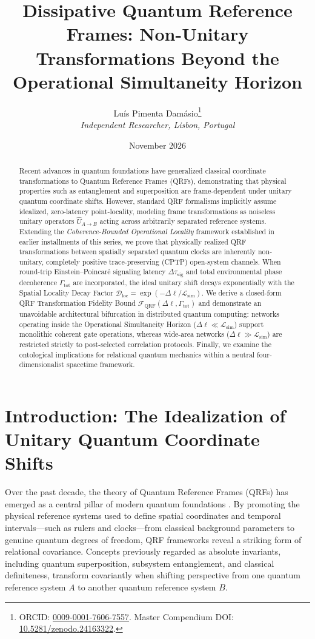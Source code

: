 \documentclass[11pt,a4paper]{article}
\title{\textbf{Dissipative Quantum Reference Frames: Non-Unitary Transformations Beyond the Operational Simultaneity Horizon}}
\author{
    Luís {Pimenta Damásio}\thanks{ORCID: \href{https://orcid.org/0009-0001-7606-7557}{0009-0001-7606-7557}. Master Compendium DOI: \href{https://doi.org/10.5281/zenodo.24163322}{10.5281/zenodo.24163322}.}\\
    \textit{Independent Researcher, Lisbon, Portugal}
}
\date{November 2026}
\begin{document}
\maketitle

\begin{abstract}
Recent advances in quantum foundations have generalized classical coordinate transformations to Quantum Reference Frames (QRFs), demonstrating that physical properties such as entanglement and superposition are frame-dependent under unitary quantum coordinate shifts. However, standard QRF formalisms implicitly assume idealized, zero-latency point-locality, modeling frame transformations as noiseless unitary operators $\hat{U}_{A \to B}$ acting across arbitrarily separated reference systems. Extending the \textit{Coherence-Bounded Operational Locality} framework established in earlier installments of this series, we prove that physically realized QRF transformations between spatially separated quantum clocks are inherently non-unitary, completely positive trace-preserving (CPTP) open-system channels. When round-trip Einstein--Poincaré signaling latency $\Delta\tau_{\mathrm{sig}}$ and total environmental phase decoherence $\Gamma_{\mathrm{tot}}$ are incorporated, the ideal unitary shift decays exponentially with the Spatial Locality Decay Factor $\mathcal{D}_{\mathrm{loc}} = \exp(-\Delta\ell / \mathcal{L}_{\mathrm{sim}})$. We derive a closed-form QRF Transformation Fidelity Bound $\mathcal{F}_{\mathrm{QRF}}(\Delta\ell, \Gamma_{\mathrm{tot}})$ and demonstrate an unavoidable architectural bifurcation in distributed quantum computing: networks operating inside the Operational Simultaneity Horizon ($\Delta\ell \ll \mathcal{L}_{\mathrm{sim}}$) support monolithic coherent gate operations, whereas wide-area networks ($\Delta\ell \gg \mathcal{L}_{\mathrm{sim}}$) are restricted strictly to post-selected correlation protocols. Finally, we examine the ontological implications for relational quantum mechanics within a neutral four-dimensionalist spacetime framework.
\end{abstract}

\section{Introduction: The Idealization of Unitary Quantum Coordinate Shifts}

Over the past decade, the theory of Quantum Reference Frames (QRFs) has emerged as a central pillar of modern quantum foundations \cite{giacomini2019,castroruiz2020}. By promoting the physical reference systems used to define spatial coordinates and temporal intervals---such as rulers and clocks---from classical background parameters to genuine quantum degrees of freedom, QRF frameworks reveal a striking form of relational covariance. Concepts previously regarded as absolute invariants, including quantum superposition, subsystem entanglement, and classical definiteness, transform covariantly when shifting perspective from one quantum reference system $A$ to another quantum reference system $B$.
\end{document}
